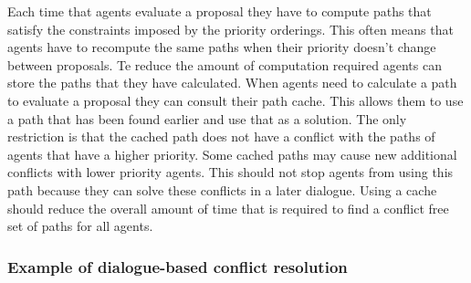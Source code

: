 Each time that agents evaluate a proposal they have to compute paths that
satisfy the constraints imposed by the priority orderings. This often means
that agents have to recompute the same paths when their priority doesn't change
between proposals. Te reduce the amount of computation required agents can
store the paths that they have calculated. When agents need to calculate a path
to evaluate a proposal they can consult their path cache. This allows them to
use a path that has been found earlier and use that as a solution. The only
restriction is that the cached path does not have a conflict with the paths of
agents that have a higher priority. Some cached paths may cause new additional
conflicts with lower priority agents. This should not stop agents from using
this path because they can solve these conflicts in a later dialogue. Using a
cache should reduce the overall amount of time that is required to find a
conflict free set of paths for all agents.

\subsubsection{Example of dialogue-based conflict resolution}

